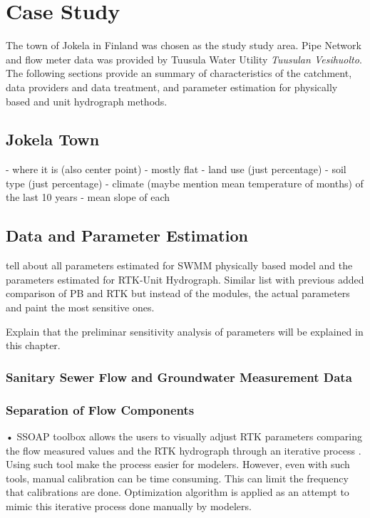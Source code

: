 
\chapter{Case Study}

The town of Jokela in Finland was chosen as the study study area. Pipe Network and flow meter data was provided by Tuusula Water Utility \textit{Tuusulan Vesihuolto}. The following sections provide an summary of characteristics of the catchment, data providers and data treatment, and parameter estimation for physically based and unit hydrograph methods.

\section{Jokela Town}

- where it is (also center point)
- mostly flat
- land use (just percentage)
- soil type (just percentage)
- climate (maybe mention mean temperature of months) of the last 10 years
- mean slope of each

\section{Data and Parameter Estimation}

tell about all parameters estimated for SWMM physically based model and the parameters estimated for RTK-Unit Hydrograph. Similar list with previous added comparison of PB and RTK but instead of the modules, the actual parameters and paint the most sensitive ones. 

Explain that the preliminar sensitivity analysis of parameters will be explained in this chapter. 


    \subsection{Sanitary Sewer Flow and Groundwater Measurement Data} \label{flowdata}
    
    
    \subsection{Separation of Flow Components}

•	SSOAP toolbox allows the users to visually adjust RTK parameters comparing the flow measured values and the RTK hydrograph through an iterative process \cite{Vallabhaneni2007}. Using such tool make the process easier for modelers. However, even with such tools, manual calibration can be time consuming. This can limit the frequency that calibrations are done. Optimization algorithm is applied as an attempt to mimic this iterative process done manually by modelers.


